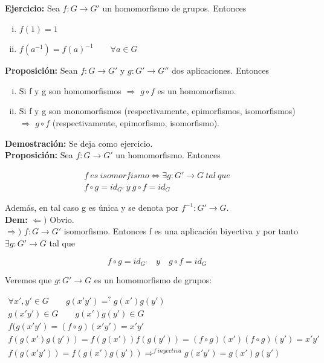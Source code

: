 \documentclass{article}
\begin{document}
\textbf{Ejercicio:} Sea $f:G\rightarrow G'$ un homomorfismo de grupos. Entonces

\begin{enumerate}[(i)]
\item $f(1)=1$
\item $f(a^{-1})=f(a)^{-1} \qquad \forall a\in G$
\end{enumerate}

\textbf{Proposición:} Sean $f:G\rightarrow G'$ y $g:G'\rightarrow G''$ dos aplicaciones. Entonces

\begin{enumerate}[(i)]
\item Si f y g son homomorfismos $\Rightarrow$ $g\circ f$ es un homomorfismo.

\item Si f y g son monomorfismos (respectivamente, epimorfismos, isomorfismos) $\Rightarrow$ $g\circ f$ (respectivamente, epimorfismo, isomorfismo).
\end{enumerate}

\textbf{Demostración:} Se deja como ejercicio. \\

\textbf{Proposición:} Sea $f:G\rightarrow G'$ un homomorfismo. Entonces 

\begin{gather*}
f~es~isomorfismo \Leftrightarrow \exists g:G'\rightarrow G~tal~que \\
f \circ g=id_{G'}~y~g\circ f=id_{G}
\end{gather*}

Además, en tal caso g es única y se denota por $f^{-1}:G'\rightarrow G$. \\

\textbf{Dem:} $\Leftarrow)$ Obvio. \\

$\Rightarrow)$ $f:G\rightarrow G'$ isomorfismo. Entonces f es una aplicación biyectiva y por tanto $\exists g:G'\rightarrow G$ tal que

\[
f \circ g=id_{G'} \quad y \quad g\circ f=id_{G}
\]

Veremos que $g:G'\rightarrow G$ es un homomorfismo de grupos:

\begin{gather*}
\forall x',y'\in G \qquad g(x'y')=^{?}g(x')g(y') \\
g(x'y')\in G \qquad g(x')g(y')\in G \\
f(g(x'y')=(f\circ g)(x'y')=x'y' \\
f(g(x')g(y'))=f(g(x'))f(g(y'))=(f\circ g)(x')(f\circ g)(y')=x'y' \\
f(g(x'y'))=f(g(x')g(y')) \Rightarrow^{f\> inyectiva} g(x'y')=g(x')g(y')
\end{gather*}
\end{document}
